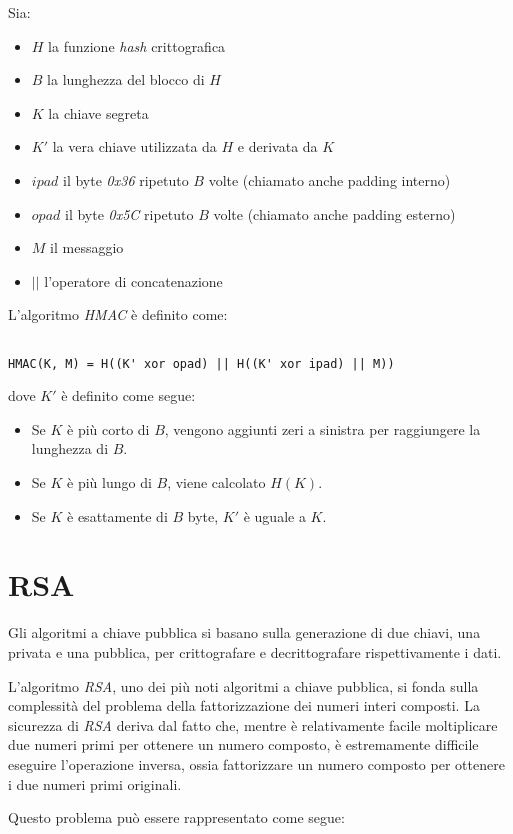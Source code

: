 \noindent Sia:
\begin{itemize}
	\item $H$ la funzione \emph{hash} crittografica
	\item $B$ la lunghezza del blocco di $H$
	\item $K$ la chiave segreta
	\item $K'$ la vera chiave utilizzata da $H$ e derivata da $K$
	\item $ipad$ il byte \emph{0x36} ripetuto $B$ volte (chiamato anche padding interno)
	\item $opad$ il byte \emph{0x5C} ripetuto $B$ volte (chiamato anche padding esterno)
	\item $M$ il messaggio
	\item $||$ l'operatore di concatenazione
\end{itemize}

\noindent L'algoritmo \emph{HMAC} è definito come:
\begin{verbatim}

HMAC(K, M) = H((K' xor opad) || H((K' xor ipad) || M))

\end{verbatim}
dove $K'$ è definito come segue:
\begin{itemize}
	\item Se $K$ è più corto di $B$, vengono aggiunti zeri a sinistra per raggiungere la lunghezza di $B$.
	\item Se $K$ è più lungo di $B$, viene calcolato $H(K)$.
	\item Se $K$ è esattamente di $B$ byte, $K'$ è uguale a $K$.
\end{itemize}


\section{RSA}
Gli algoritmi a chiave pubblica si basano sulla generazione di due chiavi, una privata e una pubblica, per crittografare e decrittografare rispettivamente i dati.

L'algoritmo \emph{RSA}, uno dei più noti algoritmi a chiave pubblica, si fonda sulla complessità del problema della fattorizzazione dei numeri interi composti.
La sicurezza di \emph{RSA} deriva dal fatto che, mentre è relativamente facile moltiplicare due numeri primi per ottenere un numero composto, è estremamente difficile eseguire l'operazione inversa, ossia fattorizzare un numero composto per ottenere i due numeri primi originali.

\noindent Questo problema può essere rappresentato come segue:

